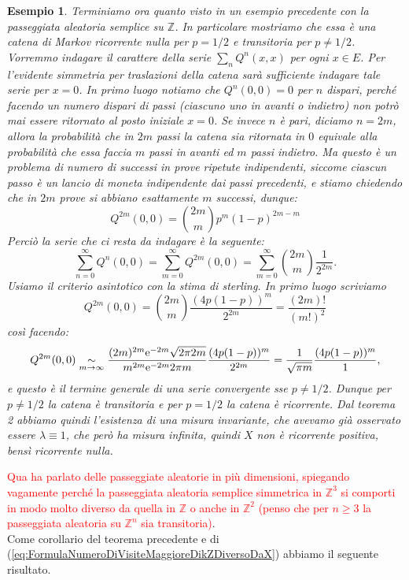 \documentclass[11pt]{book}
\theoremstyle{Definizione}
\theoremstyle{TeoremaProposizioneLemmaCorollario}
\theoremstyle{OsservazioneNota}
\newtheorem{myes}{Esempio}[section]
\newcommand{\Z}{\mathbb{Z}}
\newcommand{\e}{\textup{e}}
\begin{document}
\begin{myes}
Terminiamo ora quanto visto in un esempio precedente con la passeggiata aleatoria semplice su $\Z$. In particolare mostriamo che essa è una catena di Markov ricorrente nulla per $p = 1/2$ e transitoria per $p\neq 1/2$.
Vorremmo indagare il carattere della serie $\sum_{n} Q^n(x,x)$ per ogni $x\in E$. Per l'evidente simmetria per traslazioni della catena sarà sufficiente indagare tale serie per $x = 0$. In primo luogo notiamo che $Q^n(0,0) = 0$ per $n$ dispari, perché facendo un numero dispari di passi (ciascuno uno in avanti o indietro) non potrò mai essere ritornato al posto iniziale $x = 0$. Se invece $n$ è pari, diciamo $n = 2m$, allora la probabilità che in $2m$ passi la catena sia ritornata in $0$ equivale alla probabilità che essa faccia $m$ passi in avanti ed $m$ passi indietro. Ma questo è un problema di numero di successi in prove ripetute indipendenti, siccome ciascun passo è un lancio di moneta indipendente dai passi precedenti, e stiamo chiedendo che in $2m$ prove si abbiano esattamente $m$ successi, dunque:
$$
Q^{2m}(0,0) = \binom{2m}{m}p^{m}(1-p)^{2m-m}
$$
Perciò la serie che ci resta da indagare è la seguente:
$$
\sum_{n = 0}^\infty Q^n(0,0) = \sum_{m = 0}^\infty Q^{2m}(0,0) = \sum_{m = 0}^\infty \binom{2m}{m}\frac{1}{2^{2m}}.
$$
Usiamo il criterio asintotico con la stima di sterling. In primo luogo scriviamo
$$
Q^{2m}(0,0) = \binom{2m}{m}\frac{(4p(1-p))^m}{2^{2m}} = \frac{(2m)!}{(m!)^2}
$$
così facendo:
$$
Q^{2m}(0,0) \underset{m\to \infty}{\sim} \frac{(2m)^{2m}\e^{-2m}\sqrt{2\pi 2m}}{m^{2m}\e^{-2m}2\pi m}\frac{(4p(1-p))^m}{2^{2m}} = \frac{1}{\sqrt{\pi m}}\frac{(4p(1-p))^{m}}{1},
$$
e questo è il termine generale di una serie convergente sse $p \neq 1/2$. Dunque per $p \neq 1/2$ la catena è transitoria e per $p = 1/2$ la catena è ricorrente. Dal teorema 2 abbiamo quindi l'esistenza di una misura invariante, che avevamo già osservato essere $\lambda \equiv 1$, che però ha misura infinita, quindi $X$ non è ricorrente positiva, bensì ricorrente nulla.
\end{myes}
\noindent
\textcolor{red}{Qua ha parlato delle passeggiate aleatorie in più dimensioni, spiegando vagamente perché la passeggiata aleatoria semplice simmetrica in $\Z^3$ si comporti in modo molto diverso  da quella in $\Z$ o anche in $\Z^2$ (penso che per $n\geq 3$ la passeggiata aleatoria su $\Z^n$ sia transitoria)}.\\
Come corollario del teorema precedente e di (\ref{eq:FormulaNumeroDiVisiteMaggioreDikZDiversoDaX}) abbiamo il seguente risultato.
\end{document}
